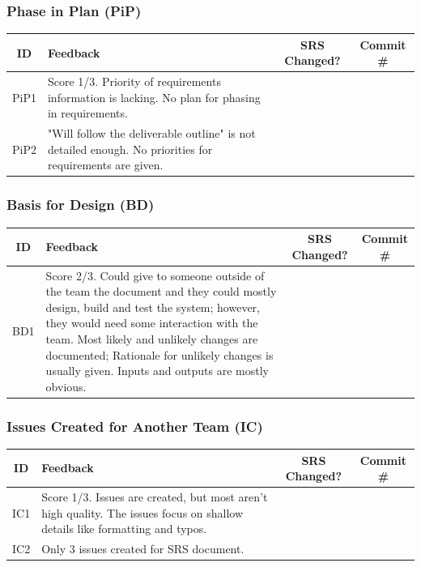 \documentclass{article}
\begin{document}
\subsubsection{Phase in Plan (PiP)}
\begin{table}[h!]
\centering
\begin{tabular}{|c|p{8cm}|c|c|}
\hline
\textbf{ID} & \textbf{Feedback} & \textbf{SRS Changed?} & \textbf{Commit \#} \\ \hline
PiP1 & Score 1/3. Priority of requirements information is lacking. No plan for phasing in requirements. & & \\ \hline
PiP2 & "Will follow the deliverable outline" is not detailed enough. No priorities for requirements are given. & & \\ \hline
\end{tabular}
\end{table}

\subsubsection{Basis for Design (BD)}
\begin{table}[h!]
\centering
\begin{tabular}{|c|p{8cm}|c|c|}
\hline
\textbf{ID} & \textbf{Feedback} & \textbf{SRS Changed?} & \textbf{Commit \#} \\ \hline
BD1 & Score 2/3. Could give to someone outside of the team the document and they could mostly design, build and test the system; however, they would need some interaction with the team. Most likely and unlikely changes are documented; Rationale for unlikely changes is usually given. Inputs and outputs are mostly obvious. & & \\ \hline
\end{tabular}
\end{table}

\subsubsection{Issues Created for Another Team (IC)}
\begin{table}[h!]
\centering
\begin{tabular}{|c|p{8cm}|c|c|}
\hline
\textbf{ID} & \textbf{Feedback} & \textbf{SRS Changed?} & \textbf{Commit \#} \\ \hline
IC1 & Score 1/3. Issues are created, but most aren't high quality. The issues focus on shallow details like formatting and typos. & & \\ \hline
IC2 & Only 3 issues created for SRS document. & & \\ \hline
\end{tabular}
\end{table}
\end{document}
